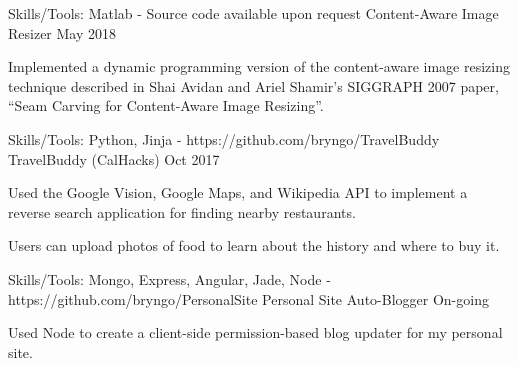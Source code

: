

\begin{cventries}

  \cventry
  {Skills/Tools: Matlab - Source code available upon request} %
  {Content-Aware Image Resizer} %
  {} %
  {May 2018} %
  {
  \begin{cvitems} %
    \item {Implemented a dynamic programming version of the content-aware image resizing technique described in Shai Avidan and Ariel Shamir’s SIGGRAPH 2007 paper, “Seam Carving for Content-Aware Image Resizing”.}
  \end{cvitems}
  }

  \cventry
  {Skills/Tools: Python, Jinja - https://github.com/bryngo/TravelBuddy} %
  {TravelBuddy (CalHacks)} %
  {} %
  {Oct 2017} %
  {
  \begin{cvitems} %
    \item {Used the Google Vision, Google Maps, and Wikipedia API to implement a reverse search application for finding nearby restaurants.}
    \item {Users can upload photos of food to learn about the history and where to buy it.}
  \end{cvitems}
  }


  \cventry
  {Skills/Tools: Mongo, Express, Angular, Jade, Node - https://github.com/bryngo/PersonalSite} %
  {Personal Site Auto-Blogger} %
  {} %
  {On-going} %
  {
  \begin{cvitems} %
    \item {Used Node to create a client-side permission-based blog updater for my personal site.}
  \end{cvitems}
  }


\end{cventries}
